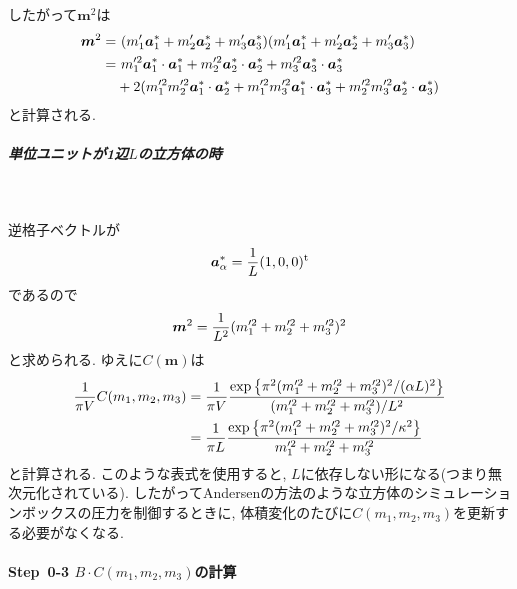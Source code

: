 したがって$\bm{m}^{2}$は
\begin{align}
   \bm{m}^{2}
=&~
   (m_{1}^{\prime}\bm{a}_{1}^{*} + m_{2}^{\prime} \bm{a}_{2}^{*}+ m_{3}^{\prime}\bm{a}_{3}^{*})
   (m_{1}^{\prime}\bm{a}_{1}^{*} + m_{2}^{\prime} \bm{a}_{2}^{*}+ m_{3}^{\prime}\bm{a}_{3}^{*})
 \notag
 \\
 =&~
     m_{1}^{\prime 2} \bm{a}_{1}^{*} \cdot \bm{a}_{1}^{*}
   + m_{2}^{\prime 2} \bm{a}_{2}^{*} \cdot \bm{a}_{2}^{*}
   + m_{3}^{\prime 2} \bm{a}_{3}^{*} \cdot \bm{a}_{3}^{*}
 \notag
 \\
 &+ 2 (  m_{1}^{\prime 2} m_{2}^{\prime 2} \bm{a}_{1}^{*} \cdot \bm{a}_{2}^{*}
       + m_{1}^{\prime 2} m_{3}^{\prime 2} \bm{a}_{1}^{*} \cdot \bm{a}_{3}^{*}
       + m_{2}^{\prime 2} m_{3}^{\prime 2} \bm{a}_{2}^{*} \cdot \bm{a}_{3}^{*} )
 \notag
\end{align}
と計算される.
\\

\subparagraph{単位ユニットが1辺$L$の立方体の時} \

逆格子ベクトルが
\begin{align}
 \bm{a}_{\alpha}^{*} = \frac{1}{L} (1, 0, 0)^{\mathrm{t}}
 \notag
\end{align}
であるので
\begin{align}
   \bm{m}^{2}
 =
   \frac{1}{L^2} (m_{1}^{\prime 2} + m_{2}^{\prime 2} + m_{3}^{\prime 2})^{2}
 \notag
\end{align}
と求められる. ゆえに$C(\bm{m})$は
\begin{align}
   \frac{1}{\pi V} C(m_{1}, m_{2}, m_{3})
 &=
   \frac{1}{\pi V}
   \frac{\exp\left\{\pi^{2} (m_{1}^{\prime 2} + m_{2}^{\prime 2} + m_{3}^{\prime 2})^{2}/(\alpha L)^2\right\}}
        {(m_{1}^{\prime 2} + m_{2}^{\prime 2} + m_{3}^{\prime 2})/L^2}
 \notag
 \\
  &=
   \frac{1}{\pi L}
   \frac{\exp\left\{\pi^{2} (m_{1}^{\prime 2} + m_{2}^{\prime 2} + m_{3}^{\prime 2})^{2}/\kappa^2\right\}}
        {m_{1}^{\prime 2} + m_{2}^{\prime 2} + m_{3}^{\prime 2}}
 \notag
\end{align}
と計算される.
このような表式を使用すると, $L$に依存しない形になる(つまり無次元化されている).
したがってAndersenの方法のような立方体のシミュレーションボックスの圧力を制御するときに, 体積変化のたびに$C(m_1, m_2, m_3)$を更新する必要がなくなる.


\paragraph{Step~0-3 $B \cdot C(m_{1}, m_{2}, m_{3})$の計算} \


